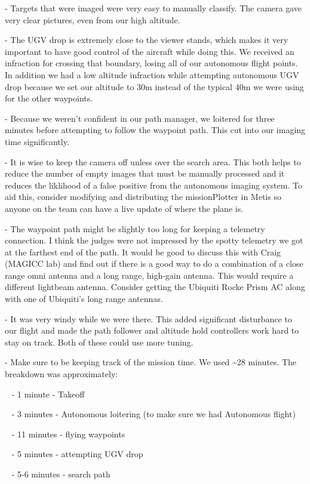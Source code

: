 {- Targets that were imaged were very easy to manually classify. The
camera gave very clear pictures, even from our high altitude.}

{- The UGV drop is extremely close to the viewer stands, which makes it
very important to have good control of the aircraft while doing this. We
received an infraction for crossing that boundary, losing all of our
autonomous flight points. In addition we had a low altitude infraction
while attempting autonomous UGV drop because we set our altitude to 30m
instead of the typical 40m we were using for the other waypoints. }

{- Because we weren't confident in our path manager, we loitered for
three minutes before attempting to follow the waypoint path. This cut
into our imaging time significantly.}

{- It is wise to keep the camera off unless over the search area. This
both helps to reduce the number of empty images that must be manually
processed and it reduces the liklihood of a false positive from the
autonomous imaging system. To aid this, consider modifying and
distributing the missionPlotter in Metis so anyone on the team can have
a live update of where the plane is.}

{- The waypoint path might be slightly too long for keeping a telemetry
connection. I think the judges were not impressed by the spotty
telemetry we got at the farthest end of the path. It would be good to
discuss this with Craig (MAGICC lab) and find out if there is a good way
to do a combination of a close range omni antenna and a long range,
high-gain antenna. This would require a different lightbeam antenna.
Consider getting the Ubiquiti Rocke Prism AC along with one of
Ubiquiti's long range antennas.}

{- It was very windy while we were there. This added significant
disturbance to our flight and made the path follower and altitude hold
controllers work hard to stay on track. Both of these could use more
tuning.}

{- Make sure to be keeping track of the mission time. We used
\textasciitilde{}28 minutes. The breakdown was approximately:}

{~ - 1 minute - Takeoff}

{~ - 3 minutes - Autonomous loitering (to make sure we had Autonomous
flight)}

{~ - 11 minutes - flying waypoints}

{~ - 5 minutes - attempting UGV drop}

{~ - 5-6 minutes - search path}

